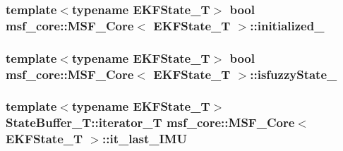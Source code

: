 \hypertarget{classmsf__core_1_1MSF__Core_a18790ea445cf51f8c5845dafcc2b4cb8}{
\subsubsection[{initialized\-\_\-}]{\setlength{\rightskip}{0pt plus 5cm}template$<$typename E\-K\-F\-State\-\_\-\-T$>$ bool {\bf msf\-\_\-core\-::\-M\-S\-F\-\_\-\-Core}$<$ E\-K\-F\-State\-\_\-\-T $>$\-::initialized\-\_\-\hspace{0.3cm}{\ttfamily [private]}}}\label{classmsf__core_1_1MSF__Core_a18790ea445cf51f8c5845dafcc2b4cb8}
\hypertarget{classmsf__core_1_1MSF__Core_ad2feab0ef759136b599cc249049b833f}{
\subsubsection[{isfuzzy\-State\-\_\-}]{\setlength{\rightskip}{0pt plus 5cm}template$<$typename E\-K\-F\-State\-\_\-\-T$>$ bool {\bf msf\-\_\-core\-::\-M\-S\-F\-\_\-\-Core}$<$ E\-K\-F\-State\-\_\-\-T $>$\-::isfuzzy\-State\-\_\-\hspace{0.3cm}{\ttfamily [private]}}}\label{classmsf__core_1_1MSF__Core_ad2feab0ef759136b599cc249049b833f}
\hypertarget{classmsf__core_1_1MSF__Core_a55c7abe519e665bd97feabf4b0584067}{
\subsubsection[{it\-\_\-last\-\_\-\-I\-M\-U}]{\setlength{\rightskip}{0pt plus 5cm}template$<$typename E\-K\-F\-State\-\_\-\-T$>$ {\bf State\-Buffer\-\_\-\-T\-::iterator\-\_\-\-T} {\bf msf\-\_\-core\-::\-M\-S\-F\-\_\-\-Core}$<$ E\-K\-F\-State\-\_\-\-T $>$\-::it\-\_\-last\-\_\-\-I\-M\-U\hspace{0.3cm}{\ttfamily [private]}}}\label{classmsf__core_1_1MSF__Core_a55c7abe519e665bd97feabf4b0584067}
